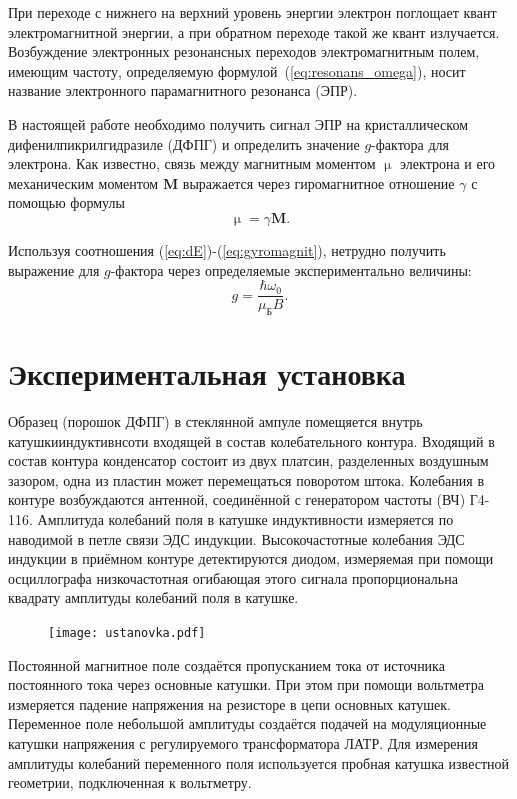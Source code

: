\documentclass[a4paper,12pt]{article} %
\begin{document}
	При переходе с нижнего на верхний уровень энергии электрон поглощает квант электромагнитной энергии, а при обратном переходе такой же квант излучается. Возбуждение электронных резонансных переходов электромагнитным полем, имеющим частоту, определяемую формулой~(\ref{eq:resonans_omega}), носит название электронного парамагнитного резонанса (ЭПР).
	
	В настоящей работе необходимо получить сигнал ЭПР на кристаллическом дифенилпикрилгидразиле (ДФПГ) и определить значение $g$-фактора для электрона. Как известно, связь между магнитным моментом $\upmu$ электрона и его механическим моментом $\mathbf{M}$ выражается через гиромагнитное отношение $\gamma$ с помощью формулы
	\begin{equation}
		\label{eq:gyromagnit}
		\upmu = \gamma \mathbf{M}.
	\end{equation}

	Используя соотношения (\ref{eq:dE})-(\ref{eq:gyromagnit}), нетрудно получить выражение для $g$-фактора через определяемые экспериментально величины:
	\begin{equation}
		\label{eq:g-faktor}
		\tag{$\star$}
		g = \frac{\hbar \omega_0}{\mu_\text{Б}B}.
	\end{equation}

\newpage
\section{Экспериментальная установка}
	Образец (порошок ДФПГ) в стеклянной ампуле помещяется внутрь катушкииндуктивнсоти входящей в состав колебательного контура. Входящий в состав контура конденсатор состоит из двух платсин, разделенных воздушным зазором, одна из пластин может перемещаться поворотом штока. Колебания в контуре возбуждаются антенной, соединённой с генератором частоты (ВЧ) Г4-116. Амплитуда колебаний поля в катушке индуктивности измеряется по наводимой в петле связи ЭДС индукции. Высокочастотные колебания ЭДС индукции в приёмном контуре детектируются диодом, измеряемая при помощи осциллографа низкочастотная огибающая этого сигнала пропорциональна квадрату амплитуды колебаний поля в катушке.
	\begin{figure}[h!]
		\begin{floatrow}
			{\texttt{[image: ustanovka.pdf]}}    
		\end{floatrow}
	\end{figure}
	
	Постоянной магнитное поле создаётся пропусканием тока от источника постоянного тока через основные катушки. При этом при помощи вольтметра измеряется падение напряжения на резисторе в цепи основных катушек. Переменное поле небольшой амплитуды создаётся подачей на модуляционные катушки напряжения с регулируемого трансформатора ЛАТР. Для измерения амплитуды колебаний переменного поля используется пробная катушка известной геометрии, подключенная к вольтметру.
	
\end{document}
